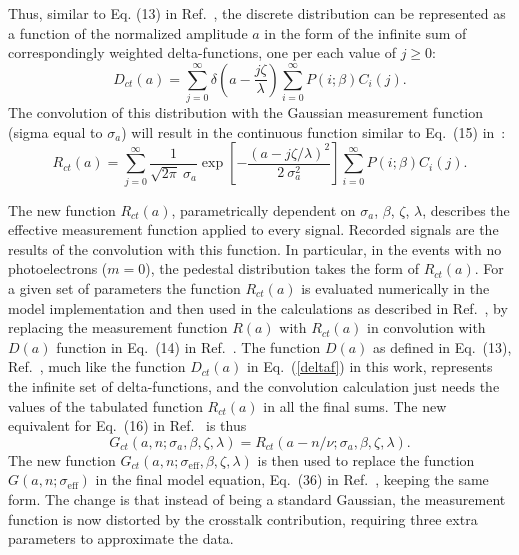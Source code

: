 Thus, similar to Eq. (13) in Ref.~\cite{DEGTIARENKO20171}, the discrete distribution can be represented as a function of the normalized amplitude $a$ in the form of the infinite sum of correspondingly weighted delta-functions, one per each value of $j \geq 0$:
\begin{equation}
\label{deltaf}
  D_{ct}(a)= \sum\limits_{j=0}^{\infty}
  \delta \left (a - \frac{j\zeta}{\lambda} \right )
   \sum\limits_{i=0}^{\infty} P(i;\beta) C_i(j) .
\end{equation}
The convolution of this distribution with the Gaussian measurement function (sigma equal to $\sigma_a$) will result in the continuous function similar to Eq.~(15) in~\cite{DEGTIARENKO20171}:
\begin{equation}
\label{RCmodel}
  R_{ct}(a)= \sum\limits_{j=0}^{\infty} \frac{1}{\sqrt{2 \pi} \ \sigma_a} 
  \exp{\left [- \frac{(a - j \zeta / \lambda)^{2}}{2 
\ \sigma_a^{2}} \right ]}
   \sum\limits_{i=0}^{\infty} P(i;\beta) C_i(j) .
\end{equation}

The new function $R_{ct}(a)$, parametrically dependent on $\sigma_a$, $\beta$, $\zeta$, $\lambda$, describes the effective measurement function applied to every signal. Recorded signals are the results of the convolution with this function. In particular, in the events with no photoelectrons ($m=0$), the pedestal distribution takes the form of $R_{ct}(a)$. For a given set of parameters the function $R_{ct}(a)$ is evaluated numerically in the model implementation and then used in the calculations as described in Ref.~\cite{DEGTIARENKO20171}, by replacing the measurement function $R(a)$ with $R_{ct}(a)$ in convolution with $D(a)$ function in Eq.~(14) in Ref.~\cite{DEGTIARENKO20171}. The function $D(a)$ as defined in Eq.~(13), Ref.~\cite{DEGTIARENKO20171}, much like the function $D_{ct}(a)$ in Eq.~(\ref{deltaf}) in this work, represents the infinite set of delta-functions, and the convolution calculation just needs the values of the tabulated function $R_{ct}(a)$ in all the final sums. The new equivalent for Eq.~(16) in Ref.~\cite{DEGTIARENKO20171} is thus
\begin{equation}
\label{GCmodel}
  G_{ct}(a,n;\sigma_a,\beta,\zeta,\lambda)= R_{ct}(a-n/\nu;\sigma_a,\beta,\zeta,\lambda).
\end{equation}
The new function $G_{ct}(a,n;\sigma_{\mathrm{eff}},\beta,\zeta,\lambda)$ is then used to replace the function $G(a,n;\sigma_{\mathrm{eff}})$ in the final model equation, Eq.~(36) in Ref.~\cite{DEGTIARENKO20171}, keeping the same form. The change is that instead of being a standard Gaussian, the measurement function is now distorted by the crosstalk contribution, requiring three extra parameters to approximate the data.
